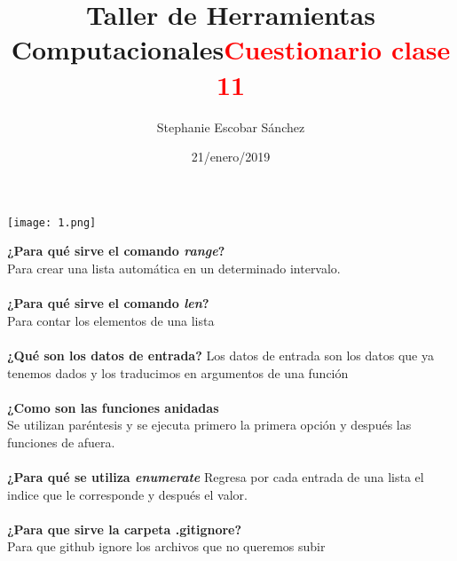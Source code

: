 \documentclass{article}
\title{\Huge Taller de Herramientas Computacionales}
\author{Stephanie Escobar Sánchez}
\date{21/enero/2019}
\begin{document}
	\maketitle
\begin{center}
	\texttt{[image: 1.png]}	
\end{center}
\newpage
\begin{center}
\title {\textcolor{red}{\Huge \textbf{Cuestionario clase 11}} } 
\end{center}
\textbf{¿Para qué sirve el comando \textit{range}?}\\
Para crear una lista automática en un determinado intervalo.\\
\\
\textbf{¿Para qué sirve el comando \textit{len}?}\\
Para contar los elementos de una lista\\
\\
\textbf{¿Qué son los datos de entrada?}
Los datos de entrada son los datos que ya tenemos dados y los traducimos en argumentos de una función\\
\\
\textbf{¿Como son las funciones anidadas}\\
Se utilizan paréntesis y se ejecuta primero la primera opción y después las funciones de afuera.\\
\\
\textbf{¿Para qué se utiliza \textit{enumerate}}
Regresa por cada entrada de una lista el indice que le corresponde y después el valor.\\
\\
\textbf{¿Para que sirve la carpeta .gitignore?}\\
Para que github ignore los archivos que no queremos subir
\end{document}

